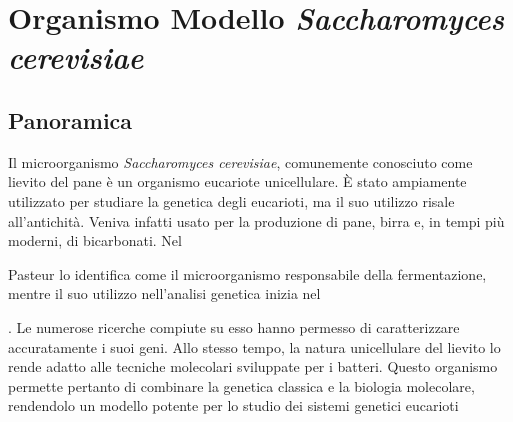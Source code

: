\section*{Organismo Modello \emph{Saccharomyces cerevisiae}}

	\subsection*{Panoramica}
	Il microorganismo \emph{Saccharomyces cerevisiae}, comunemente conosciuto come lievito del pane \`e un organismo eucariote unicellulare.
	\`E stato ampiamente utilizzato per studiare la genetica degli eucarioti, ma il suo utilizzo risale all'antichit\`a.
	Veniva infatti usato per la produzione di pane, birra e, in tempi pi\`u moderni, di bicarbonati.
	Nel \date{1857} Pasteur lo identifica come il microorganismo responsabile della fermentazione, mentre il suo utilizzo nell'analisi genetica inizia nel \date{1935}.
	Le numerose ricerche compiute su esso hanno permesso di caratterizzare accuratamente i suoi geni.
	Allo stesso tempo, la natura unicellulare del lievito lo rende adatto alle tecniche molecolari sviluppate per i batteri.
	Questo organismo permette pertanto di combinare la genetica classica e la biologia molecolare, rendendolo un modello potente per lo studio dei sistemi genetici eucarioti


